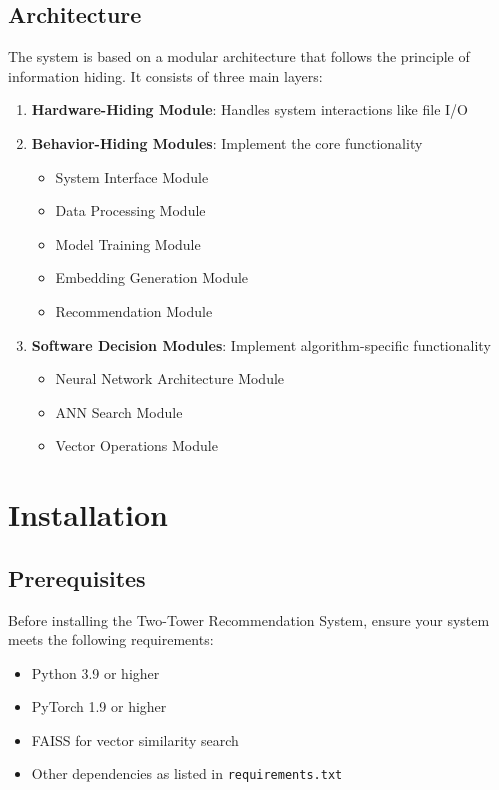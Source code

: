 \documentclass[12pt, a4paper, oneside]{book}
\begin{document}
\section{Architecture}
The system is based on a modular architecture that follows the principle of information hiding. It consists of three main layers:

\begin{enumerate}
    \item \textbf{Hardware-Hiding Module}: Handles system interactions like file I/O
    \item \textbf{Behavior-Hiding Modules}: Implement the core functionality
        \begin{itemize}
            \item System Interface Module
            \item Data Processing Module
            \item Model Training Module
            \item Embedding Generation Module
            \item Recommendation Module
        \end{itemize}
    \item \textbf{Software Decision Modules}: Implement algorithm-specific functionality
        \begin{itemize}
            \item Neural Network Architecture Module
            \item ANN Search Module
            \item Vector Operations Module
        \end{itemize}
\end{enumerate}


\chapter{Installation}

\section{Prerequisites}
Before installing the Two-Tower Recommendation System, ensure your system meets the following requirements:

\begin{itemize}
    \item Python 3.9 or higher
    \item PyTorch 1.9 or higher
    \item FAISS for vector similarity search
    \item Other dependencies as listed in \texttt{requirements.txt}
\end{itemize}
\end{document}
